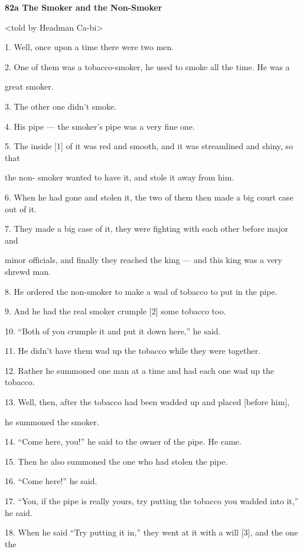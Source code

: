 
{\Large{}\textbf{82a The Smoker and the Non-Smoker    }}

{\Large{}<told by Headman Ca-bi>}

{\Large{}1. Well, once upon a time there were two men.}

{\Large{}2. One of them was a tobacco-smoker, he used to smoke all the time. He
was a     }

{\Large{}great smoker.}

{\Large{}3. The other one didn't smoke.}

{\Large{}4. His pipe --- the smoker's pipe was a very fine one.}

{\Large{}5. The inside [1] of it was red and smooth, and it was streamlined and
shiny, so that     }

{\Large{}the non- smoker wanted to have it, and stole it away from him.}

{\Large{}6. When he had gone and stolen it, the two of them then made a big court
case out of it.}

{\Large{}7. They made a big case of it, they were fighting with each other before
major and     }

{\Large{}minor officials, and finally they reached the king --- and this king was
a very shrewd man.}

{\Large{}8. He ordered the non-smoker to make a wad of tobacco to put in the pipe.}

{\Large{}9. And he had the real smoker crumple [2] some tobacco too.}

{\Large{}10. ``Both of you crumple it and put it down here,'' he said.}

{\Large{}11.  He didn't have them wad up the tobacco while they were together.}

{\Large{}12. Rather he summoned one man at a time and had each one wad up the tobacco.}

{\Large{}13. Well, then, after the tobacco had been wadded up and placed [before
him],      }

{\Large{}he summoned the smoker.}

{\Large{}14. ``Come here, you!'' he said to the owner of the pipe. He came.}

{\Large{}15. Then he also summoned the one who had stolen the pipe.}

{\Large{}16. ``Come here!'' he said.}

{\Large{}17. ``You, if the pipe is really yours, try putting the tobacco you wadded
into it,'' he said.}

{\Large{}18. When he said ``Try putting it in,'' they went at it with a will [3],
and the one the      }

